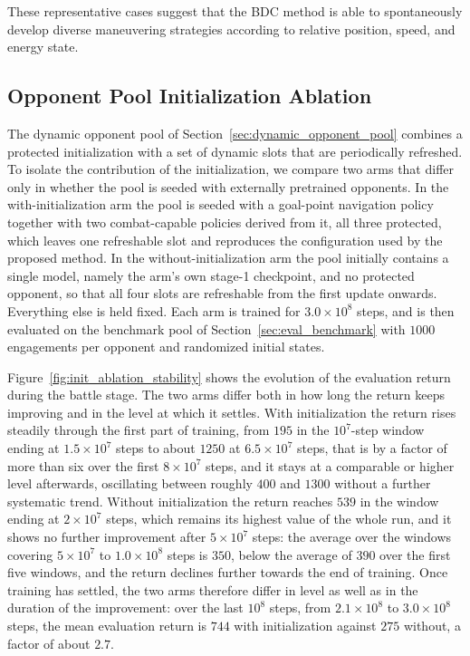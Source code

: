 \documentclass[pdflatex,sn-mathphys-num]{sn-jnl}%
\theoremstyle{thmstyleone}%
\theoremstyle{thmstyletwo}%
\theoremstyle{thmstylethree}%
\begin{document}
These representative cases suggest that the BDC method is able to spontaneously develop diverse maneuvering strategies according to relative position, speed, and energy state. 

\subsection{Opponent Pool Initialization Ablation}
\label{sec:init_ablation}

The dynamic opponent pool of Section~\ref{sec:dynamic_opponent_pool} combines a protected initialization with a set of dynamic slots that are periodically refreshed. To isolate the contribution of the initialization, we compare two arms that differ only in whether the pool is seeded with externally pretrained opponents. In the with-initialization arm the pool is seeded with a goal-point navigation policy together with two combat-capable policies derived from it, all three protected, which leaves one refreshable slot and reproduces the configuration used by the proposed method. In the without-initialization arm the pool initially contains a single model, namely the arm's own stage-1 checkpoint, and no protected opponent, so that all four slots are refreshable from the first update onwards. Everything else is held fixed. Each arm is trained for $3.0\times10^8$ steps, and is then evaluated on the benchmark pool of Section~\ref{sec:eval_benchmark} with $1000$ engagements per opponent and randomized initial states.

Figure~\ref{fig:init_ablation_stability} shows the evolution of the evaluation return during the battle stage. The two arms differ both in how long the return keeps improving and in the level at which it settles. With initialization the return rises steadily through the first part of training, from $195$ in the $10^7$-step window ending at $1.5\times10^7$ steps to about $1250$ at $6.5\times10^7$ steps, that is by a factor of more than six over the first $8\times10^7$ steps, and it stays at a comparable or higher level afterwards, oscillating between roughly $400$ and $1300$ without a further systematic trend. Without initialization the return reaches $539$ in the window ending at $2\times10^7$ steps, which remains its highest value of the whole run, and it shows no further improvement after $5\times10^7$ steps: the average over the windows covering $5\times10^7$ to $1.0\times10^8$ steps is $350$, below the average of $390$ over the first five windows, and the return declines further towards the end of training. Once training has settled, the two arms therefore differ in level as well as in the duration of the improvement: over the last $10^8$ steps, from $2.1\times10^8$ to $3.0\times10^8$ steps, the mean evaluation return is $744$ with initialization against $275$ without, a factor of about $2.7$.
\end{document}
